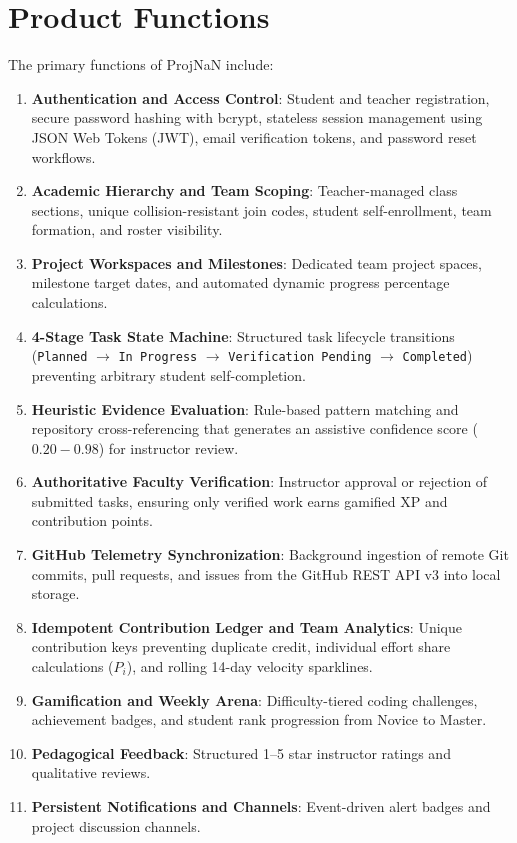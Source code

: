 \documentclass{scrreprt}
\begin{document}
\section{Product Functions}\label{sec:product_functions}
The primary functions of ProjNaN include:
\begin{enumerate}
    \item \textbf{Authentication and Access Control}: Student and teacher registration, secure password hashing with bcrypt, stateless session management using JSON Web Tokens (JWT), email verification tokens, and password reset workflows.
    \item \textbf{Academic Hierarchy and Team Scoping}: Teacher-managed class sections, unique collision-resistant join codes, student self-enrollment, team formation, and roster visibility.
    \item \textbf{Project Workspaces and Milestones}: Dedicated team project spaces, milestone target dates, and automated dynamic progress percentage calculations.
    \item \textbf{4-Stage Task State Machine}: Structured task lifecycle transitions (\texttt{Planned} $\rightarrow$ \texttt{In Progress} $\rightarrow$ \texttt{Verification Pending} $\rightarrow$ \texttt{Completed}) preventing arbitrary student self-completion.
    \item \textbf{Heuristic Evidence Evaluation}: Rule-based pattern matching and repository cross-referencing that generates an assistive confidence score ($0.20 - 0.98$) for instructor review.
    \item \textbf{Authoritative Faculty Verification}: Instructor approval or rejection of submitted tasks, ensuring only verified work earns gamified XP and contribution points.
    \item \textbf{GitHub Telemetry Synchronization}: Background ingestion of remote Git commits, pull requests, and issues from the GitHub REST API v3 into local storage.
    \item \textbf{Idempotent Contribution Ledger and Team Analytics}: Unique contribution keys preventing duplicate credit, individual effort share calculations ($P_i$), and rolling 14-day velocity sparklines.
    \item \textbf{Gamification and Weekly Arena}: Difficulty-tiered coding challenges, achievement badges, and student rank progression from Novice to Master.
    \item \textbf{Pedagogical Feedback}: Structured 1--5 star instructor ratings and qualitative reviews.
    \item \textbf{Persistent Notifications and Channels}: Event-driven alert badges and project discussion channels.
\end{enumerate}
\end{document}
